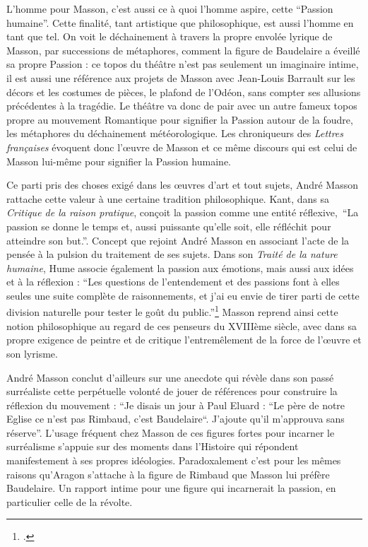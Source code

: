 	L’homme pour Masson, c’est aussi ce à quoi l’homme aspire, cette \enquote{Passion humaine}. Cette finalité, tant artistique que philosophique, est aussi l’homme en tant que tel. On voit le déchainement à travers la propre envolée lyrique de Masson, par successions de métaphores, comment la figure de Baudelaire a éveillé sa propre Passion : ce topos du théâtre n’est pas seulement un imaginaire intime, il est aussi une référence aux projets de Masson avec Jean-Louis Barrault sur les décors et les costumes de pièces, le plafond de l’Odéon, sans compter ses allusions précédentes à la tragédie. Le théâtre va donc de pair avec un autre fameux topos propre au mouvement Romantique pour signifier la Passion autour de la foudre, les métaphores du déchainement météorologique. Les chroniqueurs des \emph{Lettres françaises} évoquent donc l’\oe{}uvre de Masson et ce même discours qui est celui de Masson lui-même pour signifier la Passion humaine. 

Ce parti pris des choses exigé dans les \oe{}uvres d’art et tout sujets, André Masson rattache cette valeur à une certaine tradition philosophique. Kant, dans sa \emph{Critique de la raison pratique}, conçoit la passion comme une entité réflexive, \enquote{La passion se donne le temps et, aussi puissante qu’elle soit, elle réfléchit pour atteindre son but.}. Concept que rejoint André Masson en associant l’acte de la pensée à la pulsion du traitement de ses sujets. Dans son \emph{Traité de la nature humaine}, Hume associe également la passion aux émotions, mais aussi aux idées et à la réflexion : \enquote{Les questions de l'entendement et des passions font à elles seules une suite complète de raisonnements, et j'ai eu envie de tirer parti de cette division naturelle pour tester le goût du public.}\footcite{hume}  Masson reprend ainsi cette notion philosophique au regard de ces penseurs du XVIIIème siècle, avec dans sa propre exigence de peintre et de critique l’entremêlement de la force de l’\oe{}uvre et son lyrisme. 

	 André Masson conclut d’ailleurs sur une anecdote qui révèle dans son passé surréaliste cette perpétuelle volonté de jouer de références pour construire la réflexion du mouvement : \enquote{Je disais un jour à Paul Eluard : “Le père de notre Eglise ce n’est pas Rimbaud, c’est Baudelaire“. J’ajoute qu’il m’approuva sans réserve}. L'usage fréquent chez Masson de ces figures fortes pour incarner le surréalisme s’appuie sur des moments dans l’Histoire qui répondent manifestement à ses propres idéologies. Paradoxalement c’est pour les mêmes raisons qu’Aragon s’attache à la figure de Rimbaud que Masson lui préfère Baudelaire. Un rapport intime pour une figure qui incarnerait la passion, en particulier celle de la révolte. 

